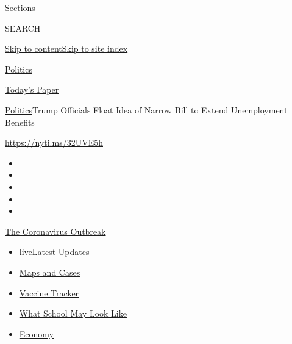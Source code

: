 Sections

SEARCH

\protect\hyperlink{site-content}{Skip to
content}\protect\hyperlink{site-index}{Skip to site index}

\href{https://www.nytimes.com/section/politics}{Politics}

\href{https://myaccount.nytimes.com/auth/login?response_type=cookie\&client_id=vi}{}

\href{https://www.nytimes.com/section/todayspaper}{Today's Paper}

\href{/section/politics}{Politics}\textbar{}Trump Officials Float Idea
of Narrow Bill to Extend Unemployment Benefits

\url{https://nyti.ms/32UVE5h}

\begin{itemize}
\item
\item
\item
\item
\item
\end{itemize}

\href{https://www.nytimes.com/news-event/coronavirus?action=click\&pgtype=Article\&state=default\&region=TOP_BANNER\&context=storylines_menu}{The
Coronavirus Outbreak}

\begin{itemize}
\tightlist
\item
  live\href{https://www.nytimes.com/2020/08/01/world/coronavirus-covid-19.html?action=click\&pgtype=Article\&state=default\&region=TOP_BANNER\&context=storylines_menu}{Latest
  Updates}
\item
  \href{https://www.nytimes.com/interactive/2020/us/coronavirus-us-cases.html?action=click\&pgtype=Article\&state=default\&region=TOP_BANNER\&context=storylines_menu}{Maps
  and Cases}
\item
  \href{https://www.nytimes.com/interactive/2020/science/coronavirus-vaccine-tracker.html?action=click\&pgtype=Article\&state=default\&region=TOP_BANNER\&context=storylines_menu}{Vaccine
  Tracker}
\item
  \href{https://www.nytimes.com/interactive/2020/07/29/us/schools-reopening-coronavirus.html?action=click\&pgtype=Article\&state=default\&region=TOP_BANNER\&context=storylines_menu}{What
  School May Look Like}
\item
  \href{https://www.nytimes.com/live/2020/07/31/business/stock-market-today-coronavirus?action=click\&pgtype=Article\&state=default\&region=TOP_BANNER\&context=storylines_menu}{Economy}
\end{itemize}

